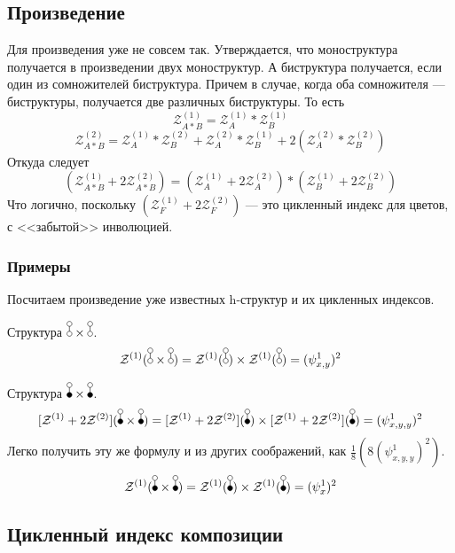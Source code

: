 \subsection{Произведение}
Для произведения уже не совсем так. Утверждается, что моноструктура получается
в произведении двух моноструктур. А биструктура получается, если один из
сомножителей биструктура. Причем в случае, когда оба сомножителя ---
биструктуры, получается две различных биструктуры. То есть
$$
\mathcal Z_{A * B}^{(1)} = \mathcal Z_A^{(1)} * \mathcal Z_B^{(1)}
$$
$$
\mathcal Z_{A * B}^{(2)} = 
\mathcal Z_A^{(1)} * \mathcal Z_B^{(2)} + 
\mathcal Z_A^{(2)} * \mathcal Z_B^{(1)} +
2 (\mathcal Z_A^{(2)} * \mathcal Z_B^{(2)})
$$
Откуда следует
$$
(\mathcal Z_{A * B}^{(1)} + 2\mathcal Z_{A * B}^{(2)}) = 
(\mathcal Z_A^{(1)} + 2\mathcal Z_A^{(2)}) * 
(\mathcal Z_B^{(1)} + 2\mathcal Z_B^{(2)})
 $$
Что логично, поскольку $(\mathcal Z_F^{(1)} + 2\mathcal Z_F^{(2)})$ --- это
цикленный индекс для цветов, с <<забытой>> инволюцией.

\subsubsection{Примеры}
Посчитаем произведение уже известных h-структур и их цикленных индексов.

Структура $\dA \times \dA$.
$$
\mathcal Z^{(1)}(\dA \times \dA) = \mathcal Z^{(1)}(\dA) \times \mathcal
Z^{(1)}(\dA) = (\psi_{x, y}^1)^2
$$

Структура $\dB \times \dB$.
$$
\Zfull(\dB \times \dB) = \Zfull(\dB) \times \Zfull(\dB) =(\psi_{x, y, y}^1)^2
$$
Легко получить эту же формулу и из других соображений, как
$\frac{1}{8}(8(\psi_{x, y, y}^1)^2)$.
$$
\mathcal Z^{(1)}(\dB \times \dB) = \mathcal Z^{(1)}(\dB) \times \mathcal
Z^{(1)}(\dB) =(\psi_{x}^1)^2
$$

\subsection{Цикленный индекс композиции}
